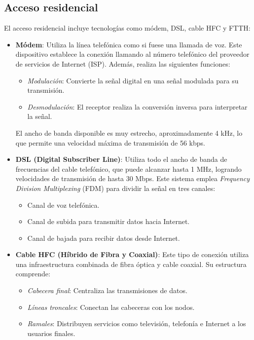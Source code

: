 \documentclass{article}
\begin{document}
\subsection{Acceso residencial}
El acceso residencial incluye tecnologías como módem, DSL, cable HFC y FTTH:
\begin{itemize}
    \item \textbf{Módem}: Utiliza la línea telefónica como si fuese una llamada de voz. Este dispositivo establece la conexión llamando al número telefónico del proveedor de servicios de Internet (ISP). Además, realiza las siguientes funciones:
    \begin{itemize}
        \item \textit{Modulación}: Convierte la señal digital en una señal modulada para su transmisión.
        \item \textit{Desmodulación}: El receptor realiza la conversión inversa para interpretar la señal.
    \end{itemize}
    El ancho de banda disponible es muy estrecho, aproximadamente 4 kHz, lo que permite una velocidad máxima de transmisión de 56 kbps.
    
    \item \textbf{DSL (Digital Subscriber Line)}: Utiliza todo el ancho de banda de frecuencias del cable telefónico, que puede alcanzar hasta 1 MHz, logrando velocidades de transmisión de hasta 30 Mbps. Este sistema emplea \textit{Frequency Division Multiplexing} (FDM) para dividir la señal en tres canales:
    \begin{itemize}
        \item Canal de voz telefónica.
        \item Canal de subida para transmitir datos hacia Internet.
        \item Canal de bajada para recibir datos desde Internet.
    \end{itemize}
    
    \item \textbf{Cable HFC (Híbrido de Fibra y Coaxial)}: Este tipo de conexión utiliza una infraestructura combinada de fibra óptica y cable coaxial. Su estructura comprende:
    \begin{itemize}
        \item \textit{Cabecera final}: Centraliza las transmisiones de datos.
        \item \textit{Líneas troncales}: Conectan las cabeceras con los nodos.
        \item \textit{Ramales}: Distribuyen servicios como televisión, telefonía e Internet a los usuarios finales.
    \end{itemize}
    

\end{itemize}
\end{document}
